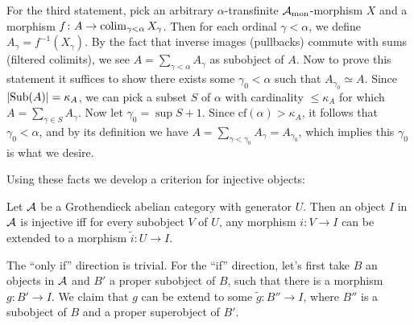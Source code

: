 \documentclass[twoside]{article}
\begin{document}
For the third statement, pick an arbitrary $\alpha$-transfinite ${\mathcal{A}}_{\mathrm{mon}}$-morphism $X$ and a morphism $f\colon A \rightarrow \operatorname*{\mathrm{colim}}_{\gamma < \alpha} X_\gamma$. Then for each ordinal $\gamma < \alpha$, we define $A_\gamma = f^{-1} (X_\gamma)$. By the fact that inverse images (pullbacks) commute with sums (filtered colimits), we see $A = \sum_{\gamma < \alpha} A_\gamma$ as subobject of $A$. Now to prove this statement it suffices to show there exists some $\gamma_0 < \alpha$ such that $A_{\gamma_0} \simeq A$. Since $\left| \mathrm{Sub}(A) \right| = \kappa_A$, we can pick a subset $S$ of $\alpha$ with cardinality $\leq \kappa_A$ for which $A = \sum_{\gamma \in S} A_\gamma$. Now let $\gamma_0 = \sup S + 1$. Since $\mathrm{cf}(\alpha) > \kappa_A$, it follows that $\gamma_0 < \alpha$, and by its definition we have $A = \sum_{\gamma < \gamma_0} A_\gamma = A_{\gamma_0}$, which implies this $\gamma_0$ is what we desire.
\epf

Using these facts we develop a criterion for injective objects:
\begin{lemma} \label{baer}
Let ${\mathcal{A}}$ be a Grothendieck abelian category with generator $U$. Then an object $I$ in ${\mathcal{A}}$ is injective iff for every subobject $V$ of $U$, any morphism $i\colon V \rightarrow I$ can be extended to a morphism $\widetilde{i}\colon U \rightarrow I$.
\end{lemma}
The ``only if'' direction is trivial. For the ``if'' direction, let's first take $B$ an objects in ${\mathcal{A}}$ and $B'$ a proper subobject of $B$, such that there is a morphism $g\colon B' \rightarrow I$. We claim that $g$ can be extend to some $\widetilde{g}\colon B'' \rightarrow I$, where $B''$ is a subobject of $B$ and a proper superobject of $B'$.\\
\end{document}
